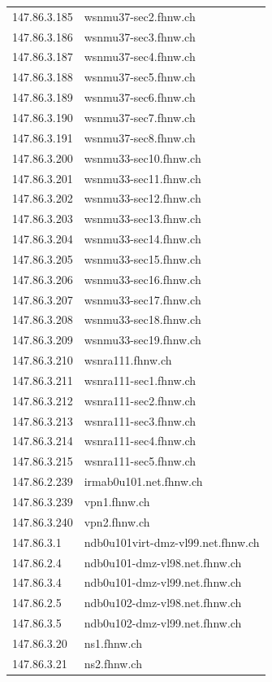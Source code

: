 \documentclass[11pt,a4paper]{scrartcl}
\begin{document}
\begin{longtable}{p{2.5cm}|p{7cm}}
	147.86.3.185 & wsnmu37-sec2.fhnw.ch \\
	147.86.3.186 & wsnmu37-sec3.fhnw.ch \\
	147.86.3.187 & wsnmu37-sec4.fhnw.ch \\
	147.86.3.188 & wsnmu37-sec5.fhnw.ch \\
	147.86.3.189 & wsnmu37-sec6.fhnw.ch \\
	147.86.3.190 & wsnmu37-sec7.fhnw.ch \\
	147.86.3.191 & wsnmu37-sec8.fhnw.ch \\
	147.86.3.200 & wsnmu33-sec10.fhnw.ch \\
	147.86.3.201 & wsnmu33-sec11.fhnw.ch \\
	147.86.3.202 & wsnmu33-sec12.fhnw.ch \\
	147.86.3.203 & wsnmu33-sec13.fhnw.ch \\
	147.86.3.204 & wsnmu33-sec14.fhnw.ch \\
	147.86.3.205 & wsnmu33-sec15.fhnw.ch \\
	147.86.3.206 & wsnmu33-sec16.fhnw.ch \\
	147.86.3.207 & wsnmu33-sec17.fhnw.ch \\
	147.86.3.208 & wsnmu33-sec18.fhnw.ch \\
	147.86.3.209 & wsnmu33-sec19.fhnw.ch \\
	147.86.3.210 & wsnra111.fhnw.ch \\
	147.86.3.211 & wsnra111-sec1.fhnw.ch \\
	147.86.3.212 & wsnra111-sec2.fhnw.ch \\
	147.86.3.213 & wsnra111-sec3.fhnw.ch \\
	147.86.3.214 & wsnra111-sec4.fhnw.ch \\
	147.86.3.215 & wsnra111-sec5.fhnw.ch \\
	147.86.2.239 & irmab0u101.net.fhnw.ch \\
	147.86.3.239 & vpn1.fhnw.ch \\
	147.86.3.240 & vpn2.fhnw.ch \\
	147.86.3.1 & ndb0u101virt-dmz-vl99.net.fhnw.ch \\
	147.86.2.4 & ndb0u101-dmz-vl98.net.fhnw.ch \\
	147.86.3.4 & ndb0u101-dmz-vl99.net.fhnw.ch \\
	147.86.2.5 & ndb0u102-dmz-vl98.net.fhnw.ch \\
	147.86.3.5 & ndb0u102-dmz-vl99.net.fhnw.ch \\
	147.86.3.20 & ns1.fhnw.ch \\
	147.86.3.21 & ns2.fhnw.ch \\

\end{longtable}
\end{document}
